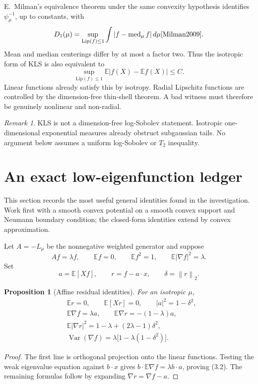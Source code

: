 \documentclass[11pt]{article}
\newtheorem{proposition}[theorem]{Proposition}
\theoremstyle{definition}
\theoremstyle{remark}
\newtheorem{remark}[theorem]{Remark}
\newcommand{\E}{\mathbb E}
\newcommand{\Var}{\operatorname{Var}}
\newcommand{\Lip}{\mathrm{Lip}}
\newcommand{\1}{\mathbf 1}
\newcommand{\dd}{\,d}
\newcommand{\norm}[1]{\left\lVert #1\right\rVert}
\begin{document}
E.~Milman's equivalence theorem under the same convexity hypothesis
identifies \(\psi_\mu^{-1}\), up to constants, with
\[
 D_1(\mu)=
 \sup_{\Lip(f)\le1}\int|f-\operatorname{med}_\mu f|\dd\mu
 \cite{Milman2009}.
\]
Mean and median centerings differ by at most a factor two.  Thus the
isotropic form of KLS is also equivalent to
\[
 \sup_{\Lip(f)\le1}\E|f(X)-\E f(X)|\le C.            \tag{M}
\]
Linear functions already satisfy this by isotropy.  Radial Lipschitz
functions are controlled by the dimension-free thin-shell theorem.  A bad
witness must therefore be genuinely nonlinear and non-radial.

\begin{remark}
KLS is not a dimension-free log-Sobolev statement.  Isotropic
one-dimensional exponential measures already obstruct subgaussian tails.
No argument below assumes a uniform log-Sobolev or \(T_2\) inequality.
\end{remark}

\section{An exact low-eigenfunction ledger}

This section records the most useful general identities found in the
investigation.  Work first with a smooth convex potential on a smooth
convex support and Neumann boundary condition; the closed-form identities
extend by convex approximation.

Let \(A=-L_\mu\) be the nonnegative weighted generator and suppose
\[
 Af=\lambda f,\qquad
 \E f=0,\qquad \E f^2=1,\qquad \E|\nabla f|^2=\lambda.
\]
Set
\[
 a=\E[Xf],\qquad r=f-a\cdot x,\qquad \delta=\norm r_2.
\]

\begin{proposition}[Affine residual identities]
For an isotropic \(\mu\),
\begin{align}
 &\E r=0,\qquad \E[Xr]=0,
 \qquad |a|^2=1-\delta^2,                              \tag{3.1}\\
 &\E\nabla f=\lambda a,
 \qquad \E\nabla r=-(1-\lambda)a,                    \tag{3.2}\\
 &\E|\nabla r|^2
   =1-\lambda+(2\lambda-1)\delta^2,                  \tag{3.3}\\
 &\Var(\nabla f)
   =\lambda\bigl[1-\lambda(1-\delta^2)\bigr].       \tag{3.4}
\end{align}
\end{proposition}

\begin{proof}
The first line is orthogonal projection onto the linear functions.
Testing the weak eigenvalue equation against \(b\cdot x\) gives
\(b\cdot\E\nabla f=\lambda b\cdot a\), proving (3.2).
The remaining formulas follow by expanding
\(\nabla r=\nabla f-a\).
\end{proof}
\end{document}
